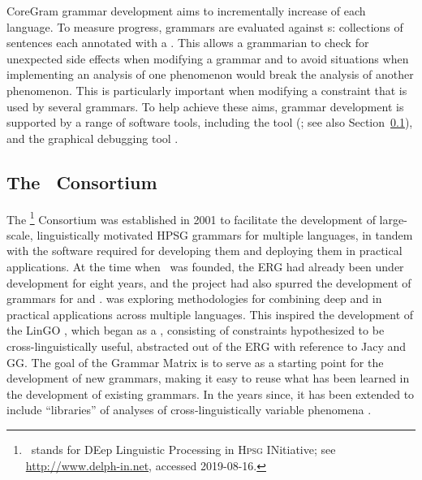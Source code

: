 \documentclass[output=paper,biblatex,babelshorthands,newtxmath,draftmode,colorlinks,citecolor=brown]{langscibook}
\begin{document}
CoreGram grammar development aims to incrementally increase  of each language.  To
measure progress, grammars are evaluated against s: collections of sentences each
annotated with a  \citep{ONK97a,Mueller2004f}.  This allows a
grammarian to check for unexpected side effects when modifying a grammar and to avoid situations
when implementing an analysis of one phenomenon would break the analysis of another phenomenon.
This is particularly important when modifying a constraint that is used by several grammars.  To
help achieve these aims, grammar development is supported by a range of software tools, including
the  tool \itsdb (\citealp{Oepen:01}; see also Section~\ref{cl:delphin}),
and the graphical debugging tool  \citep{DER2010a-u,DER2013a}.

\subsection{The \delphin\ Consortium}
\label{cl:delphin}

%
The \delphin\footnote{\delphin\ stands for DEep Linguistic Processing in \textsc{Hpsg} INitiative;
  see \url{http://www.delph-in.net}, accessed 2019-08-16.} Consortium was established in 2001 to
facilitate the development of large-scale, linguistically motivated HPSG grammars for multiple
languages, in tandem with the software required for developing them and deploying them in practical
applications. At the time when \delphin\ was founded, the ERG \citep{Flickinger2000a,Flickinger2011a-u} had already been under development
for eight years, and the \verbmobil project \citep{Wahlster2000a-ed} had also spurred the
development of grammars for  \citep[GG;][]{MK2000a,Crysmann2003b} and
 \citep*[Jacy;][]{SBB2016a}. 
\citep*{Callmeier-etal:2004} was exploring methodologies for combining deep and
 in practical applications across multiple languages. This inspired
the development of the LinGO  \citep*{BFO2002a-u}, which began as a , consisting of constraints hypothesized to be cross-linguistically useful, abstracted out
of the ERG with reference to Jacy and GG. The goal of the Grammar Matrix is to serve as a starting
point for the development of new grammars, making it easy to reuse what has been learned in the
development of existing grammars. In the years since, it has been extended to include
``libraries'' of analyses of cross-linguistically variable phenomena
\citep[e.g.,][]{Drellishak2009a-u,BDFPS2010a-u}.
\end{document}
